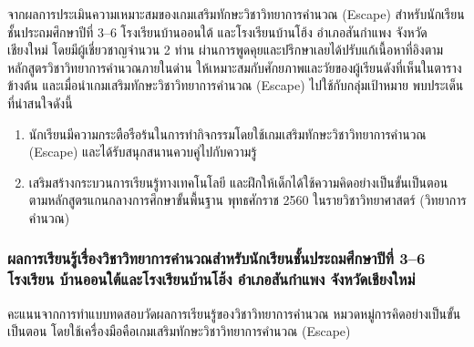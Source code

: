 จากผลการประเมินความเหมาะสมของเกมเสริมทักษะวิชาวิทยาการคำนวณ (Escape) สำหรับนักเรียนชั้นประถมศึกษาปีที่ 
3--6 โรงเรียนบ้านออนใต้ และโรงเรียนบ้านโฮ้ง อำเภอสันกำแพง จังหวัดเชียงใหม่ 
โดยมีผู้เชี่ยวชาญจำนวน 2 ท่าน ผ่านการพูดคุยและปรึกษาเลยได้ปรับแก้เนื้อหาที่อิงตามหลักสูตรวิชาวิทยาการคำนวณภายในด่าน 
ให้เหมาะสมกับศักยภาพและวัยของผู้เรียนดังที่เห็นในตารางข้างต้น และเมื่อนำเกมเสริมทักษะวิชาวิทยาการคำนวณ (Escape) 
ไปใช้กับกลุ่มเป้าหมาย พบประเด็นที่น่าสนใจดังนี้

\begin{enumerate}
    \item นักเรียนมีความกระตือรือร้นในการทำกิจกรรมโดยใช้เกมเสริมทักษะวิชาวิทยาการคำนวณ (Escape) และได้รับสนุกสนานควบคู่ไปกับความรู้ 
    \item เสริมสร้างกระบวนการเรียนรู้ทางเทคโนโลยี และฝึกให้เด็กได้ใช้ความคิดอย่างเป็นขั้นเป็นตอน \newline ตามหลักสูตรแกนกลางการศึกษาขั้นพื้นฐาน พุทธศักราช 2560 ในรายวิชาวิทยาศาสตร์ (วิทยาการคำนวณ)
\end{enumerate}

\subsubsection{ผลการเรียนรู้เรื่องวิชาวิทยาการคำนวณสำหรับนักเรียนชั้นประถมศึกษาปีที่ 3--6 โรงเรียน บ้านออนใต้และโรงเรียนบ้านโฮ้ง อำเภอสันกำแพง จังหวัดเชียงใหม่}

คะแนนจากการทำแบบทดสอบวัดผลการเรียนรู้ของวิชาวิทยาการคำนวณ หมวดหมู่การคิดอย่างเป็นขั้นเป็นตอน โดยใช้เครื่องมือคือเกมเสริมทักษะวิชาวิทยาการคำนวณ (Escape)
\begin{center}
\end{center}

